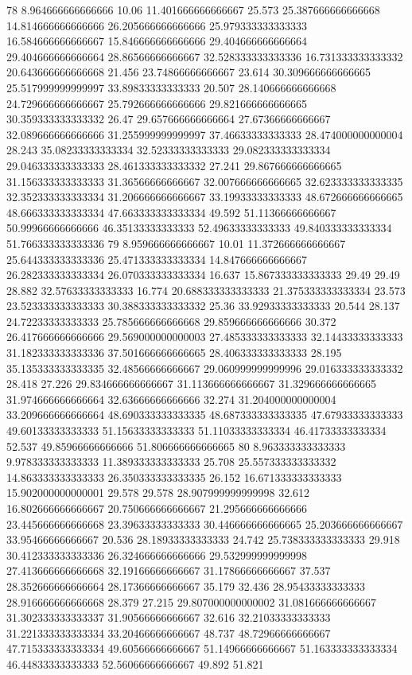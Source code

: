 78 8.964666666666666 10.06 11.401666666666667 25.573 25.387666666666668 14.814666666666666 26.205666666666666 25.979333333333333 16.584666666666667 15.846666666666666 29.404666666666664 29.404666666666664 28.86566666666667 32.528333333333336 16.731333333333332 20.643666666666668 21.456 23.74866666666667 23.614 30.309666666666665 25.517999999999997 33.89833333333333 20.507 28.140666666666668 24.729666666666667 25.792666666666666 29.821666666666665 30.359333333333332 26.47 29.657666666666664 27.67366666666667 32.089666666666666 31.255999999999997 37.46633333333333 28.474000000000004 28.243 35.08233333333334 32.52333333333333 29.082333333333334 29.046333333333333 28.461333333333332 27.241 29.867666666666665 31.156333333333333 31.36566666666667 32.007666666666665 32.623333333333335 32.352333333333334 31.206666666666667 33.19933333333333 48.672666666666665 48.666333333333334 47.663333333333334 49.592 51.11366666666667 50.99966666666666 46.35133333333333 52.49633333333333 49.840333333333334 51.766333333333336
79 8.959666666666667 10.01 11.372666666666667 25.644333333333336 25.471333333333334 14.847666666666667 26.282333333333334 26.070333333333334 16.637 15.867333333333333 29.49 29.49 28.882 32.57633333333333 16.774 20.688333333333333 21.375333333333334 23.573 23.523333333333333 30.388333333333332 25.36 33.92933333333333 20.544 28.137 24.72233333333333 25.785666666666668 29.859666666666666 30.372 26.417666666666666 29.569000000000003 27.485333333333333 32.14433333333333 31.182333333333336 37.501666666666665 28.406333333333333 28.195 35.135333333333335 32.48566666666667 29.060999999999996 29.016333333333332 28.418 27.226 29.834666666666667 31.113666666666667 31.329666666666665 31.974666666666664 32.63666666666666 32.274 31.204000000000004 33.209666666666664 48.690333333333335 48.687333333333335 47.67933333333333 49.60133333333333 51.15633333333333 51.11033333333334 46.41733333333334 52.537 49.85966666666666 51.806666666666665
80 8.963333333333333 9.978333333333333 11.389333333333333 25.708 25.557333333333332 14.863333333333333 26.350333333333335 26.152 16.671333333333333 15.902000000000001 29.578 29.578 28.907999999999998 32.612 16.802666666666667 20.750666666666667 21.295666666666666 23.445666666666668 23.39633333333333 30.446666666666665 25.203666666666667 33.95466666666667 20.536 28.18933333333333 24.742 25.738333333333333 29.918 30.412333333333336 26.324666666666666 29.532999999999998 27.413666666666668 32.19166666666667 31.17866666666667 37.537 28.352666666666664 28.17366666666667 35.179 32.436 28.95433333333333 28.916666666666668 28.379 27.215 29.807000000000002 31.081666666666667 31.302333333333337 31.90566666666667 32.616 32.21033333333333 31.221333333333334 33.20466666666667 48.737 48.72966666666667 47.715333333333334 49.60566666666667 51.14966666666667 51.163333333333334 46.44833333333333 52.56066666666667 49.892 51.821
